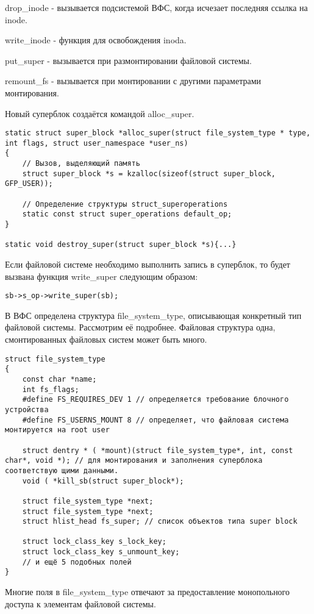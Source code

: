drop\_inode - вызывается подсистемой ВФС, когда исчезает последняя ссылка на inode.

write\_inode - функция для освобождения inoda.

put\_super - вызывается при размонтировании файловой системы. 

remount\_fs - вызывается при монтировании с другими параметрами монтирования.

Новый суперблок создаётся командой alloc\_super.
\begin{lstlisting}
static struct super_block *alloc_super(struct file_system_type * type, int flags, struct user_namespace *user_ns)
{
	// Вызов, выделяющий память
	struct super_block *s = kzalloc(sizeof(struct super_block, GFP_USER));

	// Определение структуры struct_superoperations
	static const struct super_operations default_op;
}

static void destroy_super(struct super_block *s){...}
\end{lstlisting}

Если файловой системе необходимо выполнить запись в суперблок, то будет вызвана функция write\_super следующим образом:\\
\begin{lstlisting}
sb->s_op->write_super(sb);
\end{lstlisting}

В ВФС определена структура file\_system\_type, описывающая конкретный тип файловой системы. Рассмотрим её подробнее. Файловая структура одна, смонтированных файловых систем может быть много.
\begin{lstlisting}
struct file_system_type
{
	const char *name;
	int fs_flags;
	#define FS_REQUIRES_DEV 1 // определяется требование блочного устройства
	#define FS_USERNS_MOUNT 8 // определяет, что файловая система монтируется на root user

	struct dentry * ( *mount)(struct file_system_type*, int, const char*, void *); // для монтирования и заполнения суперблока соответствую щими данными.
	void ( *kill_sb(struct super_block*);
	
	struct file_system_type *next;
	struct file_system_type *next;
	struct hlist_head fs_super; // список объектов типа super block

	struct lock_class_key s_lock_key;
	struct lock_class_key s_unmount_key;
	// и ещё 5 подобных полей
}
\end{lstlisting}

Многие поля в file\_system\_type отвечают за предоставление монопольного доступа к элементам файловой системы.

